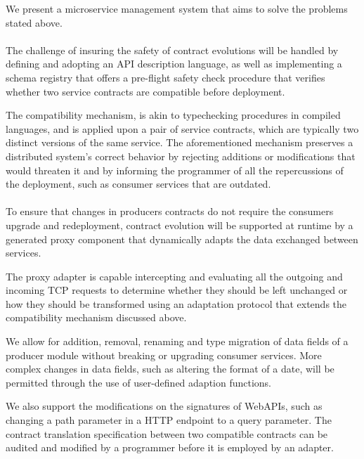 We present a microservice management system that aims to solve the problems stated above.

\paragraph{}

The challenge of insuring the safety of contract evolutions will be handled by defining and adopting an API description language, as well as implementing a schema
registry that offers a pre-flight safety check procedure that verifies whether two service contracts are compatible before
deployment.

The compatibility mechanism, is akin to typechecking procedures in compiled languages, and is applied upon a
pair of service contracts, which are typically two distinct versions of the same service. The aforementioned mechanism preserves
a distributed system's correct behavior by rejecting additions or modifications that would threaten it and by informing the programmer
of all the repercussions of the deployment, such as consumer services that are outdated.

\paragraph{}

To ensure that changes in producers contracts do not require the consumers upgrade and redeployment, contract evolution
will be supported at runtime by a generated proxy component that dynamically adapts the data exchanged between services.

The proxy adapter is capable intercepting and evaluating all the outgoing and incoming TCP requests to determine whether
they should be left unchanged or how they should be transformed using an adaptation protocol that extends the compatibility mechanism discussed above.

We allow for addition, removal, renaming and type migration of data fields of a producer module without breaking or upgrading consumer services.
More complex changes in data fields, such as altering the format of a date, will be permitted through the use of user-defined adaption functions.

We also support the modifications on the signatures of WebAPIs, such as changing a path parameter in a HTTP endpoint to a query parameter.
The contract translation specification between two compatible contracts can be audited and modified by a programmer before it is employed by an adapter.

